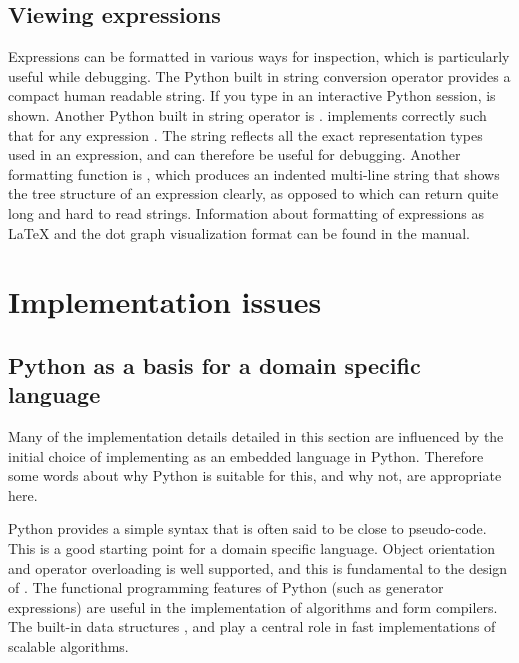 \subsection{Viewing expressions} \label{ufl:sec:viewing}
Expressions can be formatted in various ways for inspection, which is
particularly useful while debugging.  The Python built in string
conversion operator  provides a compact human readable
string. If you type  in an interactive Python session,
 is shown.  Another Python built in string operator is
.  \ufl{} implements  correctly such that
 for any expression .  The string
 reflects all the exact representation types used in an
expression, and can therefore be useful for debugging.  Another
formatting function is , which produces an
indented multi-line string that shows the tree structure of an
expression clearly, as opposed to  which can return quite
long and hard to read strings.  Information about formatting of
expressions as \LaTeX{} and the dot graph visualization format can be
found in the manual.

\section{Implementation issues} \label{ufl:sec:implementation}

\subsection{Python as a basis for a domain specific language}

Many of the implementation details detailed in this section are
influenced by the initial choice of implementing \ufl{} as an embedded
language in Python. Therefore some words about why Python is suitable
for this, and why not, are appropriate here.

Python provides a simple syntax that is often said to be close to
pseudo-code. This is a good starting point for a domain specific
language. Object orientation and operator overloading is well
supported, and this is fundamental to the design of \ufl{}. The
functional programming features of Python (such as generator
expressions) are useful in the implementation of algorithms and form
compilers. The built-in data structures ,  and
 play a central role in fast implementations of scalable
algorithms.

